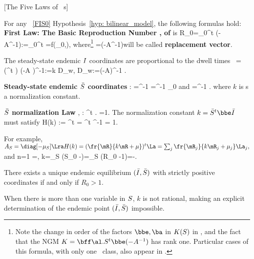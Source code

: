 \beT {} [The Five Laws of \ABa\ s]

For any \ABa\ \eqref{FIS0}
\satg Hypothesis~\ref{hyp: bilinear_model}, the following formulas hold:
\BEN
\im
\textbf{First Law: The Basic Reproduction Number \cite[(3.2)]{Fall}, \cite[(6)]{Bonzi} of } is
R_0=\y_0^t \bbe (-A^{-1})\ba :=\y_0^t \mR =f(\y_0,\ba),
\ee
where\footnote{Note the change in order of the factors $ \bbe, \ba$ in  \wrt $K(S)$ in ,
and the fact that the NGM $K=\bff \al. \y^t \bbe (-A^{-1})$ has rank one. Particular cases of this formula, with only one \sus\ class, also appear in \cite{IggidrCEP,Arino,AABBGH}.}
\mR=\bbe (-A^{-1})\ba\ee will be called {\bf replacement vector}.


\im The steady-state endemic $I$ coordinates are proportional to the dwell times~\cite[(3.5)]{Fall}
 \xe=(\y^t \bbe \x) (-A )^{-1}\ba:=k D_w, \quad D_w:=(-A)^{-1} \ba.
 \ee

\im \textbf{Steady-state endemic $\bar{S}$ coordinates} \saty:
 \ye =^{-1} \La =^{-1} \y_0
\ee
 and
 \ye=^{-1} \La.%
 \ee
 where $k$ is s a normalization constant.

\im
\textbf{$\bar{S}$ normalization Law} \cite[(3.6)]{Fall}, \cite[(4)]{Bonzi}:
 \ye ^t .{\mR} =1. \ee
 The normalization constant $k=\ye^t \bbe \xe$ must satisfy
 H(k) := \mR^t \ye = \mR^t ^{-1} \La = 1.
\ee

For example,
$ A_S=\diag[-\mu_S] \Lra H(k)=(\fr{\mR}{k \mR+\mu})^t \La=
\sum_j \fr{\mR_j}{k \mR_j+\mu_j} \La_{j},$ and
n=1 \Lra \ye=, k=\mu_S (S_0 -\ye)=\mu_S \ye(R_0 -1)=\La-.\ee

\im There exists a unique endemic equilibrium $(\bar{I},\bar{S})$ with strictly positive coordinates if and only if $R_0 >1$.
\EEN

\eeT



\beR When there is more than one variable in $S$, $k$ is not rational, making an explicit determination of the endemic point $(\bar{I},\bar{S})$ impossible.


